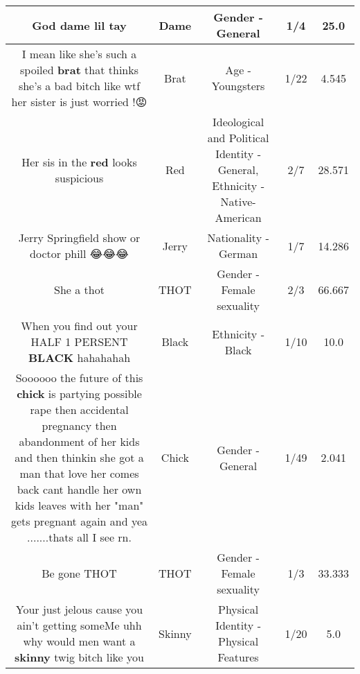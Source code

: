 \documentclass[11pt]{article}
\newlength\mylength
\begin{document}
\begin{center}
\begin{longtable}{|C{.65\mylength}|C{.30\mylength}|C{.12\mylength}|C{.12\mylength}|C{.12\mylength}|}
  \small God \textbf{dame} lil tay\normalsize   & Dame & Gender - General & 1/4 & 25.0 \\  \hline
  \small I mean like she's such a spoiled \textbf{brat} that thinks she's a bad bitch like wtf her sister is just worried !😡\normalsize   & Brat & Age - Youngsters & 1/22 & 4.545 \\  \hline
  \small Her sis in the \textbf{r\textbf{ed}} looks suspicious\normalsize   & Red &  Ideological and Political Identity - General, Ethnicity - Native-American & 2/7 & 28.571 \\  \hline
  \small Jerry Springfield show or doctor phill 😂😂😂\normalsize   & Jerry & Nationality - German & 1/7 & 14.286 \\  \hline
  \small She a thot\normalsize   & THOT & Gender - Female sexuality & 2/3 & 66.667 \\  \hline
  \small When you find out your HALF 1 PERSENT \textbf{BLACK} hahahahah\normalsize   & Black & Ethnicity - Black & 1/10 & 10.0 \\  \hline
  \small Soooooo the future of this \textbf{chick} is partying possible rape then accidental pregnancy then abandonment of her kids and then thinkin she got a man that love her comes back cant handle her own kids leaves with her "man" gets pregnant again and yea .......thats all I see rn.\normalsize   & Chick & Gender - General & 1/49 & 2.041 \\  \hline
  \small Be gone THOT\normalsize   & THOT & Gender - Female sexuality & 1/3 & 33.333 \\  \hline
  \small Your just jelous cause you ain't getting someMe uhh why would men want a \textbf{skinny} twig bitch like you\normalsize   & Skinny & Physical Identity - Physical Features & 1/20 & 5.0 \\  \hline

\end{longtable}
\end{center}
\end{document}
